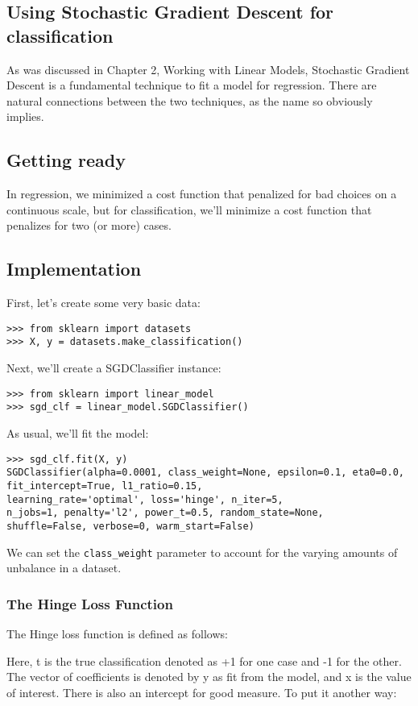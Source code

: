 \documentclass[SKL-MASTER.tex]{subfiles}
\begin{document}
\subsection{Using Stochastic Gradient Descent for classification}

As was discussed in Chapter 2, Working with Linear Models, Stochastic Gradient Descent is a
fundamental technique to fit a model for regression. There are natural connections between
the two techniques, as the name so obviously implies.
\subsection*{Getting ready}
In regression, we minimized a cost function that penalized for bad choices on a continuous
scale, but for classification, we'll minimize a cost function that penalizes for two (or more) cases.
\subsection*{Implementation} %
First, let's create some very basic data:
\begin{framed}
\begin{verbatim}
>>> from sklearn import datasets
>>> X, y = datasets.make_classification()
\end{verbatim}
\end{framed}
Next, we'll create a SGDClassifier instance:
\begin{framed}
\begin{verbatim}
>>> from sklearn import linear_model
>>> sgd_clf = linear_model.SGDClassifier()
\end{verbatim}
\end{framed}
As usual, we'll fit the model:
\begin{framed}
\begin{verbatim}
>>> sgd_clf.fit(X, y)
SGDClassifier(alpha=0.0001, class_weight=None, epsilon=0.1, eta0=0.0,
fit_intercept=True, l1_ratio=0.15,
learning_rate='optimal', loss='hinge', n_iter=5,
n_jobs=1, penalty='l2', power_t=0.5, random_state=None,
shuffle=False, verbose=0, warm_start=False)
\end{verbatim}
\end{framed}
We can set the \texttt{class\_weight} parameter to account for the varying amounts of unbalance
in a dataset.

\subsubsection{The Hinge Loss Function}
The Hinge loss function is defined as follows:

Here, t is the true classification denoted as +1 for one case and -1 for the other. The vector of
coefficients is denoted by y as fit from the model, and x is the value of interest. There is also
an intercept for good measure. To put it another way:
\[  \]
\[  \]

\end{document}
